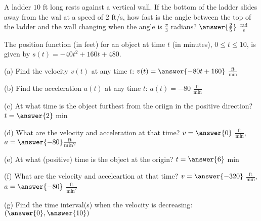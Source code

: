 \documentclass{ximera}
\begin{document}
\begin{exercise}
A ladder $10$ ft long rests against a vertical wall. If the bottom of the ladder slides away from the wal at a speed of $2$ ft/s, how fast is the angle between the top of the ladder and the wall changing when the angle is $\frac{\pi}{3}$ radians?  $\answer{\frac{2}{5}}$ $\frac{\text{rad}}{\text{s}}$
\end{exercise}

\begin{exercise}
The position function (in feet) for an object at time $t$ (in minutes), $0\leq t\leq 10$, is given by $s(t)=-40t^2+160t+480$.

(a) Find the velocity $v(t)$ at any time $t$: $v(t)=\answer{-80t+160}$ $\frac{\text{ft}}{\text{min}}$

(b) Find the acceleration $a(t)$ at any time $t$: $a(t)=-80$ $\frac{\text{ft}}{\text{min}}$

(c) At what time is the object furthest from the oriign in the positive direction? $t=\answer{2}$ min

(d) What are the velocity and acceleration at that time? $v=\answer{0}$ $\frac{\text{ft}}{\text{min}}$, $a=\answer{-80} \frac{\text{ft}}{\text{min}^2}$

(e) At what (positive) time is the object at the origin? $t=\answer{6}$ min

(f) What are the velocity and acceleartion at that time? $v=\answer{-320}$ $\frac{\text{ft}}{\text{min}}$, $a=\answer{-80}$ $\frac{\text{ft}}{\text{min}^2}$

(g) Find the time interval(s) when the velocity is decreasing: $(\answer{0},\answer{10})$
\end{exercise}
\end{document}
